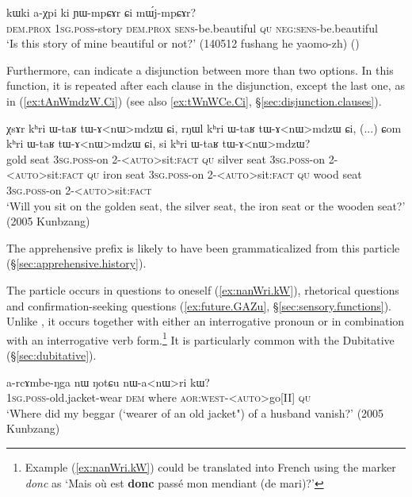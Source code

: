 \begin{exe}
\ex \label{ex:YWmpCAr.Ci}
\gll kɯki a-χpi ki ɲɯ-mpɕɤr ɕi mɯ́j-mpɕɤr? \\
\textsc{dem}.\textsc{prox} \textsc{1sg}.\textsc{poss}-story \textsc{dem}.\textsc{prox} \textsc{sens}-be.beautiful \textsc{qu} \textsc{neg}:\textsc{sens}-be.beautiful \\
\glt `Is this story of mine beautiful or not?' (140512 fushang he yaomo-zh)
()
\end{exe}

Furthermore,  can indicate a disjunction between more than two options. In this function, it is repeated after each clause in the disjunction, except the last one, as in (\ref{ex:tAnWmdzW.Ci}) (see also \ref{ex:tWnWCe.Ci}, §\ref{sec:disjunction.clauses}).

\begin{exe}
\ex \label{ex:tAnWmdzW.Ci}
\gll  χsɤr kʰri ɯ-taʁ tɯ-ɤ<nɯ>mdzɯ ɕi, rŋɯl kʰri ɯ-taʁ tɯ-ɤ<nɯ>mdzɯ ɕi, (...) ɕom kʰri ɯ-taʁ tɯ-ɤ<nɯ>mdzɯ ɕi, si kʰri ɯ-taʁ tɯ-ɤ<nɯ>mdzɯ? \\
gold seat \textsc{3sg}.\textsc{poss}-on 2-<\textsc{auto}>sit:\textsc{fact}  \textsc{qu} silver seat \textsc{3sg}.\textsc{poss}-on 2-<\textsc{auto}>sit:\textsc{fact}  \textsc{qu}  {  } iron seat \textsc{3sg}.\textsc{poss}-on 2-<\textsc{auto}>sit:\textsc{fact}  \textsc{qu} wood seat \textsc{3sg}.\textsc{poss}-on 2-<\textsc{auto}>sit:\textsc{fact}  \\
\glt `Will you sit on the golden seat, the silver seat, the iron seat or the wooden seat?' (2005 Kunbzang)
\end{exe}

The apprehensive prefix  is likely to have been grammaticalized from this particle (§\ref{sec:apprehensive.history}).

The particle  occurs in questions to oneself (\ref{ex:nanWri.kW}), rhetorical questions and confirmation-seeking questions  (\ref{ex:future.GAZu}, §\ref{sec:sensory.functions}). Unlike , it occurs together with either an interrogative pronoun or in combination with an interrogative verb form.\footnote{Example  (\ref{ex:nanWri.kW}) could be translated into French using the marker \textit{donc} as `Mais où est \textbf{donc} passé mon mendiant (de mari)?' } It is particularly common with the Dubitative (§\ref{sec:dubitative}).

\begin{exe}
\ex \label{ex:nanWri.kW}
\gll a-rcɤmbe-ŋga nɯ ŋotɕu nɯ-a<nɯ>ri kɯ? \\
\textsc{1sg}.\textsc{poss}-old.jacket-wear \textsc{dem} where \textsc{aor}:\textsc{west}-<\textsc{auto}>go[II] \textsc{qu} \\
\glt `Where did my beggar (`wearer of an old jacket") of a husband vanish?' (2005 Kunbzang)
\end{exe}

